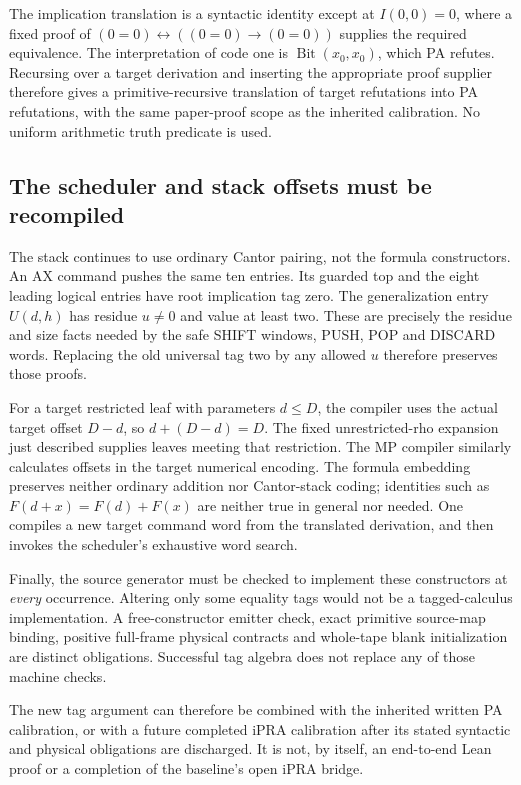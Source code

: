 The implication translation is a syntactic identity except at $I(0,0)=0$,
where a fixed proof of
$(0=0)\leftrightarrow((0=0)\to(0=0))$ supplies the required equivalence.
The interpretation of code one is $\operatorname{Bit}(x_0,x_0)$, which PA
refutes. Recursing over a target derivation and inserting the appropriate
proof supplier therefore gives a primitive-recursive translation of target
refutations into PA refutations, with the same paper-proof scope as the
inherited calibration. No uniform arithmetic truth predicate is used.

\subsection{The scheduler and stack offsets must be recompiled}

The stack continues to use ordinary Cantor pairing, not the formula
constructors. An AX command pushes the same ten entries. Its guarded top
and the eight leading logical entries have root implication tag zero.
The generalization entry $U(d,h)$ has residue $u\ne0$ and value at least
two. These are precisely the residue and size facts needed by the safe
SHIFT windows, PUSH, POP and DISCARD words. Replacing the old universal
tag two by any allowed $u$ therefore preserves those proofs.

For a target restricted leaf with parameters $d\le D$, the compiler uses
the actual target offset $D-d$, so $d+(D-d)=D$. The fixed unrestricted-rho
expansion just described supplies leaves meeting that restriction. The MP
compiler similarly calculates offsets in the target numerical encoding.
The formula embedding preserves neither ordinary addition nor Cantor-stack
coding; identities such as $F(d+x)=F(d)+F(x)$ are neither true in general
nor needed. One compiles a new target command word from the translated
derivation, and then invokes the scheduler's exhaustive word search.

Finally, the source generator must be checked to implement these constructors
at \emph{every} occurrence. Altering only some equality tags would not be
a tagged-calculus implementation. A free-constructor emitter check, exact
primitive source-map binding, positive full-frame physical contracts and
whole-tape blank initialization are distinct obligations. Successful tag
algebra does not replace any of those machine checks.

The new tag argument can therefore be combined with the inherited written
PA calibration, or with a future completed iPRA calibration after its stated
syntactic and physical obligations are discharged. It is not, by itself,
an end-to-end Lean proof or a completion of the baseline's open iPRA bridge.
